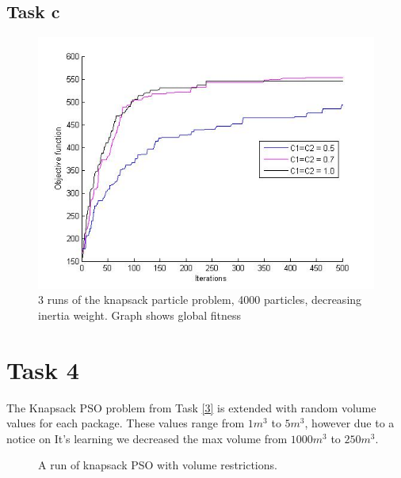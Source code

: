 \documentclass[12pt, a4paper]{article}
\begin{document}
\subsection{Task c}
\begin{figure}[H]
\begin{center}
\includegraphics[width=18cm]{KnapSack_withInteria}
\caption{3 runs of the knapsack particle problem, 4000 particles, decreasing inertia weight. Graph shows global fitness}
\end{center}
\end{figure}

\section{Task 4}
The Knapsack PSO problem from Task \ref{3} is extended with random volume values for each package. These values range from $1m^3$ to $5m^3$, however due to a notice on It's learning we decreased the max volume from $1000m^3$ to $250m^3$.
\begin{figure}[H]
\begin{center}
\caption{A run of knapsack PSO with volume restrictions.}
\end{center}

\end{figure}
\end{document}
